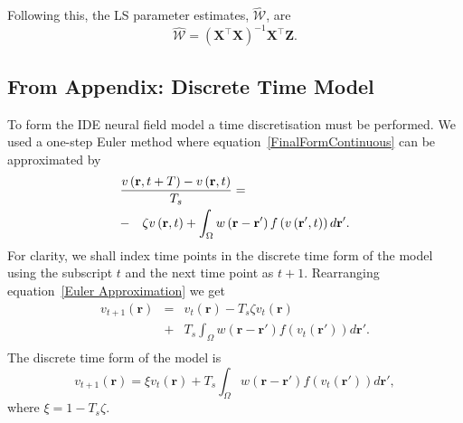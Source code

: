 \documentclass[10pt]{article}
\begin{document}
Following this, the LS parameter estimates, $ \mathcal{\hat{W}}$, are
\begin{equation}
	\mathcal{\hat{W}}=(\mathbf X^\top\mathbf X)^{-1}\mathbf X^\top\mathbf Z. 
\end{equation}

\subsection*{From Appendix: Discrete Time Model}\label{Time Discretization} To form the IDE neural field model a time discretisation must be performed. We used a one-step Euler method where equation~\ref{FinalFormContinuous} can be approximated by 
\begin{eqnarray}
	\label{Euler Approximation} \lefteqn{\frac{v\left( \mathbf{r},t+T \right) - v\left( \mathbf{r},t\right)}{T_s} =}\nonumber\\
& -&\zeta v\left( \mathbf{r},t \right) + \int_\Omega {w\left( \mathbf{r}-\mathbf{r}' \right)f\left( {v\left( \mathbf{r}',t \right)} \right)d\mathbf{r}'}.\nonumber \\ 
\end{eqnarray}
For clarity, we shall index time points in the discrete time form of the model using the subscript $t$ and the next time point as $t+1$. Rearranging equation~\ref{Euler Approximation} we get 
\begin{eqnarray}
	\label{Euler Approximation2} v_{t+1}\left( \mathbf{r}\right) &=& v_t\left( \mathbf{r}\right) -T_s \zeta v_t\left( \mathbf{r}\right)\nonumber \\
&+& T_s \int_\Omega {w\left( \mathbf{r}-\mathbf{r}' \right)f\left( {v_t\left( \mathbf{r}'\right)} \right)d\mathbf{r}'}.\nonumber \\ 
\end{eqnarray}
The discrete time form of the model is 
\begin{equation}
	\label{Discrete Time Model1} v_{t+1}\left(\mathbf{r}\right) = \xi v_t\left(\mathbf{r}\right) + T_s \int_\Omega { w\left(\mathbf{r}-\mathbf{r}'\right) f\left(v_t\left(\mathbf{r}'\right)\right) d\mathbf{r}'}, 
\end{equation}
where $\xi = 1 - T_s \zeta$.
\end{document}
